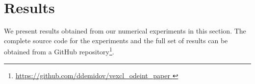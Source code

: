 \documentclass[final]{siamltex}
\begin{document}
%
%



% 
% 
% 
% 



\section{Results}

We present results obtained from our numerical experiments in this section. The complete
source code for the experiments and the full set of results can be obtained from a
GitHub repository\footnote{ \href{
https://github.com/ddemidov/vexcl_odeint_paper } {
https://github.com/ddemidov/vexcl\_odeint\_paper } }.
\end{document}
